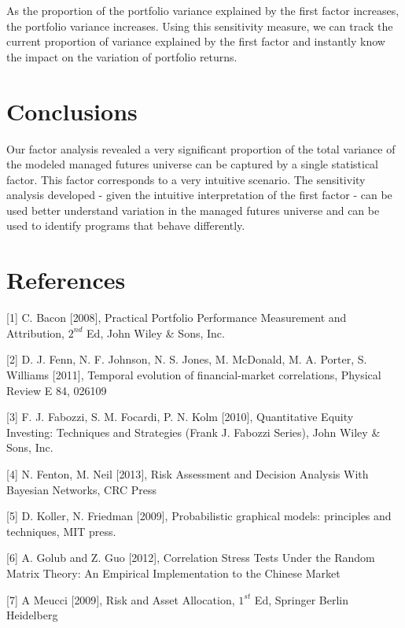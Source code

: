 \documentclass[]{article}
\begin{document}
As the proportion of the portfolio variance explained by the first
factor increases, the portfolio variance increases. Using this
sensitivity measure, we can track the current proportion of variance
explained by the first factor and instantly know the impact on the
variation of portfolio returns.

\section{Conclusions}\label{conclusions}

Our factor analysis revealed a very significant proportion of the total
variance of the modeled managed futures universe can be captured by a
single statistical factor. This factor corresponds to a very intuitive
scenario. The sensitivity analysis developed - given the intuitive
interpretation of the first factor - can be used better understand
variation in the managed futures universe and can be used to identify
programs that behave differently.

\pagebreak

\section{References}\label{references}

{[}1{]} C. Bacon {[}2008{]}, Practical Portfolio Performance Measurement
and Attribution, \(2^{nd}\) Ed, John Wiley \& Sons, Inc.

{[}2{]} D. J. Fenn, N. F. Johnson, N. S. Jones, M. McDonald, M. A.
Porter, S. Williams {[}2011{]}, Temporal evolution of financial-market
correlations, Physical Review E 84, 026109

{[}3{]} F. J. Fabozzi, S. M. Focardi, P. N. Kolm {[}2010{]},
Quantitative Equity Investing: Techniques and Strategies (Frank J.
Fabozzi Series), John Wiley \& Sons, Inc.

{[}4{]} N. Fenton, M. Neil {[}2013{]}, Risk Assessment and Decision
Analysis With Bayesian Networks, CRC Press

{[}5{]} D. Koller, N. Friedman {[}2009{]}, Probabilistic graphical
models: principles and techniques, MIT press.

{[}6{]} A. Golub and Z. Guo {[}2012{]}, Correlation Stress Tests Under
the Random Matrix Theory: An Empirical Implementation to the Chinese
Market

{[}7{]} A Meucci {[}2009{]}, Risk and Asset Allocation, \(1^{st}\) Ed,
Springer Berlin Heidelberg
\end{document}

